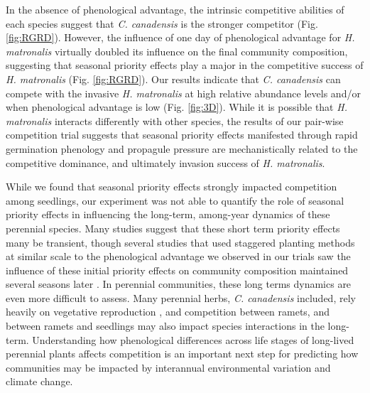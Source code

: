 \documentclass{article}[11pt]
\begin{document}
In the absence of phenological advantage, the intrinsic competitive abilities of each species suggest that \textit{C. canadensis} is the stronger competitor (Fig. \ref{fig:RGRD}). %
However, the influence of one day of phenological advantage for \textit{H. matronalis} virtually doubled its influence on the final community composition, suggesting that seasonal priority effects play a major in the competitive success of \textit{H. matronalis} (Fig. \ref{fig:RGRD}). Our results indicate that \textit{C. canadensis} can compete with the invasive \textit{H. matronalis} at high relative abundance levels and/or when phenological advantage is low (Fig. \ref{fig:3D}). While it is possible that \textit{H. matronalis} interacts differently with other species, the results of our pair-wise competition trial suggests that seasonal priority effects manifested through rapid germination phenology and propagule pressure are mechanistically related to the competitive dominance, and ultimately invasion success of \textit{H. matronalis}.

While we found that seasonal priority effects strongly impacted competition among seedlings, our experiment was not able to quantify the role of seasonal priority effects in influencing the long-term, among-year dynamics of these perennial species. %
Many studies suggest that these short term priority effects many be transient, though several studies that used staggered planting methods at similar scale to the phenological advantage we observed in our trials saw the influence of these initial priority effects on community composition maintained several seasons later \citep{Vaughn:2015wp,Young:2017aa,Torrez:2017to}. In perennial communities, these long terms dynamics are even more difficult to assess. Many perennial herbs, \textit{C. canadensis} included, rely heavily on vegetative reproduction \citep{Hawkins:2005ve}, and competition between ramets, and between ramets and seedlings may also impact species interactions in the long-term. %
Understanding how phenological differences across life stages of long-lived perennial plants affects competition is an important next step for predicting how communities may be impacted by interannual environmental variation and climate change.
\end{document}
